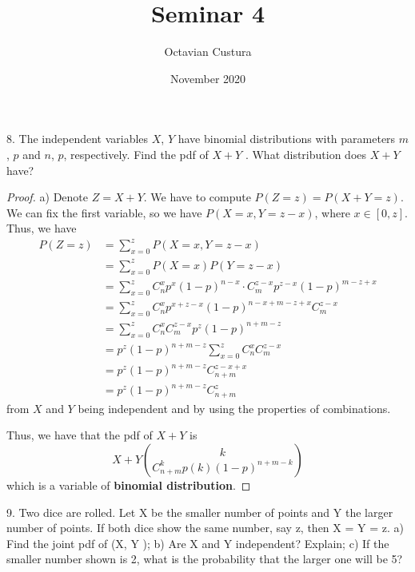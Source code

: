 \documentclass{article}
\title{Seminar 4}
\author{Octavian Custura}
\date{November 2020}
\begin{document}
\maketitle

8. The independent variables $X$, $Y$ have binomial distributions with parameters $m$, $p$ and $n$, $p$, respectively. Find the pdf of $X + Y$ . What distribution does $X + Y$ have?

\begin{proof}

a) Denote $Z = X + Y$. We have to compute $P(Z = z) = P(X + Y = z)$. We can fix the first variable, so we have $P(X = x, Y = z - x)$, where $x \in [0, z]$. Thus, we have 
\begin{equation}
\begin{split}
    P(Z = z) &= \sum\limits_{x = 0}^{z}P(X = x, Y = z - x) \\
     &= \sum\limits_{x = 0}^{z}P(X = x)P(Y = z - x) \\
     &= \sum\limits_{x = 0}^{z}C_{n}^{x}p^{x}(1-p)^{n - x} \cdot C_{m}^{z - x}p^{z - x}(1-p)^{m - z + x} \\
     &= \sum\limits_{x = 0}^{z}C_{n}^{x} p^{x + z - x} (1 - p)^{n - x + m - z + x} C_{m}^{z - x} \\
     &= \sum\limits_{x = 0}^{z}C_{n}^{x}C_{m}^{z - x} p^{z} (1-p)^{n + m - z} \\
     &= p^{z}(1 - p)^{n + m - z} \sum\limits_{x = 0}^{z}C_{n}^{x}C_{m}^{z - x} \\
     &= p^{z}(1 - p)^{n + m - z} C_{n + m}^{z - x + x} \\
     &= p^{z}(1 - p)^{n + m - z} C_{n + m}^{z}
\end{split}
\end{equation}
from $X$ and $Y$ being independent and by using the properties of combinations.

Thus, we have that the pdf of $X + Y$ is
\begin{equation}
     X+Y \binom{k}{C_{n + m}^{k}p(k)(1-p)^{n + m - k}}
\end{equation}
which is a variable of \textbf{binomial distribution}.
\end{proof}

9. Two dice are rolled. Let X be the smaller number of points and Y the larger number of points. If
both dice show the same number, say z, then X = Y = z.
a) Find the joint pdf of (X, Y );
b) Are X and Y independent? Explain;
c) If the smaller number shown is 2, what is the probability that the larger one will be 5?
\end{document}
